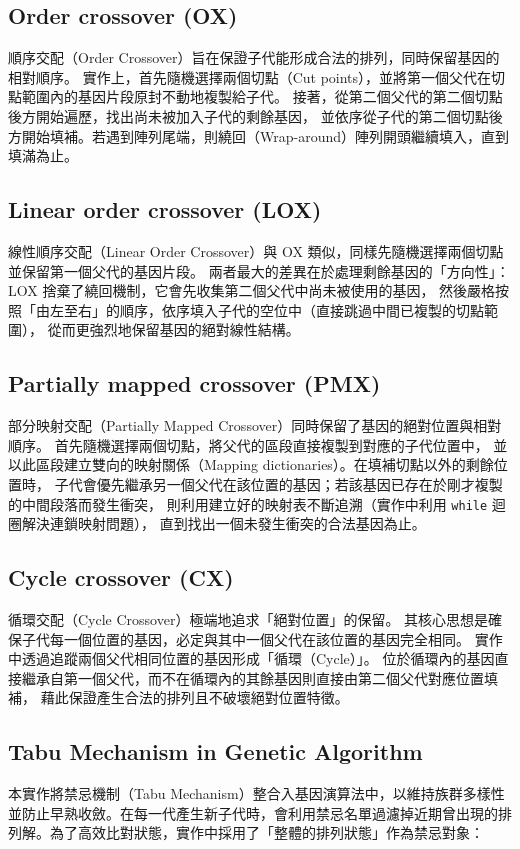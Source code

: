 \documentclass[conference]{IEEEtran}
\begin{document}
\subsection{Order crossover (OX)}
順序交配（Order Crossover）旨在保證子代能形成合法的排列，同時保留基因的相對順序。
實作上，首先隨機選擇兩個切點（Cut points），並將第一個父代在切點範圍內的基因片段原封不動地複製給子代。
接著，從第二個父代的第二個切點後方開始遍歷，找出尚未被加入子代的剩餘基因，
並依序從子代的第二個切點後方開始填補。若遇到陣列尾端，則繞回（Wrap-around）陣列開頭繼續填入，直到填滿為止。

\subsection{Linear order crossover (LOX)}
線性順序交配（Linear Order Crossover）與 OX 類似，同樣先隨機選擇兩個切點並保留第一個父代的基因片段。
兩者最大的差異在於處理剩餘基因的「方向性」：LOX 捨棄了繞回機制，它會先收集第二個父代中尚未被使用的基因，
然後嚴格按照「由左至右」的順序，依序填入子代的空位中（直接跳過中間已複製的切點範圍），
從而更強烈地保留基因的絕對線性結構。

\subsection{Partially mapped crossover (PMX)}
部分映射交配（Partially Mapped Crossover）同時保留了基因的絕對位置與相對順序。
首先隨機選擇兩個切點，將父代的區段直接複製到對應的子代位置中，
並以此區段建立雙向的映射關係（Mapping dictionaries）。在填補切點以外的剩餘位置時，
子代會優先繼承另一個父代在該位置的基因；若該基因已存在於剛才複製的中間段落而發生衝突，
則利用建立好的映射表不斷追溯（實作中利用 \texttt{while} 迴圈解決連鎖映射問題），
直到找出一個未發生衝突的合法基因為止。

\subsection{Cycle crossover (CX)}
循環交配（Cycle Crossover）極端地追求「絕對位置」的保留。
其核心思想是確保子代每一個位置的基因，必定與其中一個父代在該位置的基因完全相同。
實作中透過追蹤兩個父代相同位置的基因形成「循環（Cycle）」。
位於循環內的基因直接繼承自第一個父代，而不在循環內的其餘基因則直接由第二個父代對應位置填補，
藉此保證產生合法的排列且不破壞絕對位置特徵。


\subsection{Tabu Mechanism in Genetic Algorithm}
本實作將禁忌機制（Tabu Mechanism）整合入基因演算法中，以維持族群多樣性並防止早熟收斂。在每一代產生新子代時，會利用禁忌名單過濾掉近期曾出現的排列解。為了高效比對狀態，實作中採用了「整體的排列狀態」作為禁忌對象：
\end{document}
